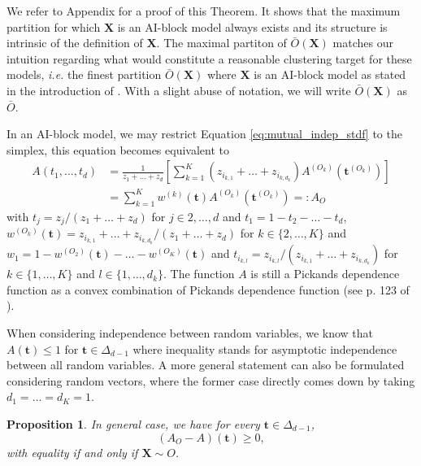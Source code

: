 \documentclass[11pt]{article}
\newtheorem{proposition}{Proposition}
\begin{document}
	We refer to Appendix for a proof of this Theorem. It shows that the maximum partition for which $\textbf{X}$ is an AI-block model always exists and its structure is intrinsic of the definition of $\textbf{X}$. The maximal partiton of $\bar{O}(\textbf{X})$ matches our intuition regarding what would constitute a reasonable clustering target for these models, \emph{i.e.} the finest partition $\bar{O}(\textbf{X})$ where $\textbf{X}$ is an AI-block model as stated in the introduction of \cite{NIPS2017_37d097ca}. With a slight abuse of notation, we will write $\bar{O}(\textbf{X})$ as $\bar{O}$. 
	
	In an AI-block model, we may restrict Equation \eqref{eq:mutual_indep_stdf} to the simplex, this equation becomes equivalent to
	\begin{align*}
		A(t_1, \dots, t_d) &= \frac{1}{z_1+\dots+z_d} \left[ \sum_{k=1}^K (z_{i_{k,1}} + \dots + z_{i_{k,d_k}}) A^{(O_k)}(\textbf{t}^{(O_k)}) \right] \\
		&= \sum_{k=1}^K w^{(k)}(\textbf{t}) A^{(O_k)}(\textbf{t}^{(O_k)}) =: A_O
	\end{align*}
	with $t_j = z_j / (z_1+\dots+z_d)$ for $j \in {2,\dots, d}$ and $t_1 = 1-t_2 - \dots - t_d$, $w^{(O_k)}(\textbf{t})  = z_{i_{k,1}} + \dots + z_{i_{k,d_k}} / (z_1 + \dots + z_{d})$ for $k \in \{2, \dots, K\}$ and $w_1 = 1-w^{(O_2)}(\textbf{t})-\dots -w^{(O_K)}(\textbf{t})$ and $t_{i_{k,l}} = z_{i_{k,l}} / (z_{i_{k,1}} + \dots + z_{i_{k,d_k}})$ for $k \in \{1, \dots, K\}$ and $l \in \{1, \dots, d_k\}$. The function $A$ is still a Pickands dependence function as a convex combination of Pickands dependence function (see p. 123 of \cite{falk2010laws}).
	
	When considering independence between random variables, we know that $A(\textbf{t}) \leq 1$ for $\textbf{t} \in \Delta_{d-1}$ where inequality stands for asymptotic independence between all random variables. A more general statement can also be formulated considering random vectors, where the former case directly comes down by taking $d_1 = \dots = d_K = 1$.
	
	\begin{proposition}
	\label{prop:ineq}
		In general case, we have for every $\textbf{t} \in \Delta_{d-1}$, 
		\begin{equation*}
			\left(A_{O} - A\right) (\textbf{t}) \geq 0,
		\end{equation*}
		with equality if and only if $\textbf{X} \sim O$.
	\end{proposition}
	
\end{document}
